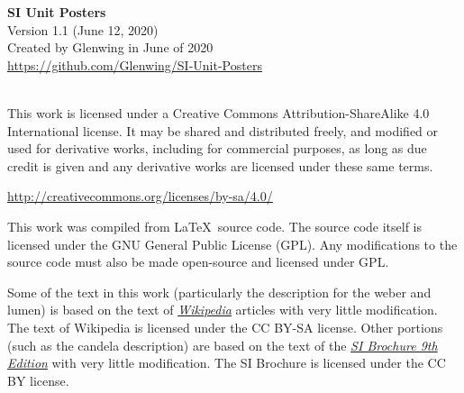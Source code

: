 \documentclass[a4paper]{article}
\renewcommand{\,}{\hspace{0.2em}} %
\begin{document}
\raggedbottom
\nopagecolor %

\thispagestyle{empty}

\begin{center}
	{\Large \textbf{SI Unit Posters}}\\
	\large
	Version 1.1 (June 12, 2020) \\
	Created by Glenwing in June of 2020\\
	\url{https://github.com/Glenwing/SI-Unit-Posters}\\
	\vspace{1cm}
	\ccLogo~\ccAttribution~\ccShareAlike
	\vspace{1cm}
\end{center}

\setlength\lineskip{0.5em}
\setlength\parskip{1em}
This work is licensed under a Creative Commons Attribution-ShareAlike 4.0 International license. It may be shared and distributed freely, and modified or used for derivative works, including for commercial purposes, as long as due credit is given and any derivative works are licensed under these same terms.

\url{http://creativecommons.org/licenses/by-sa/4.0/}

This work was compiled from \LaTeX\ source code. The source code itself is licensed under the GNU General Public License (GPL). Any modifications to the source code must also be made open-source and licensed under GPL.

Some of the text in this work (particularly the description for the weber and lumen) is based on the text of \href{https://en.wikipedia.org/wiki/Main_Page}{\textsl{Wikipedia}} articles with very little modification. The text of Wikipedia is licensed under the CC BY-SA license. Other portions (such as the candela description) are based on the text of the \href{https://www.bipm.org/utils/common/pdf/si-brochure/SI-Brochure-9-EN.pdf}{\textsl{SI Brochure 9th Edition}} with very little modification. The SI Brochure is licensed under the CC BY license.
\end{document}
